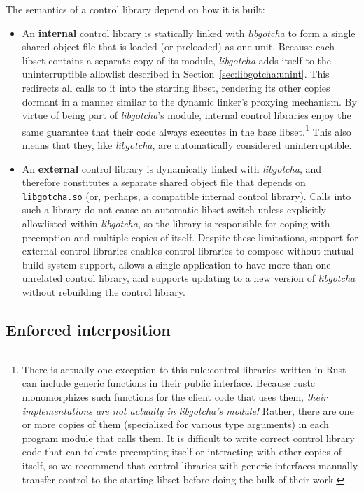 The semantics of a control library depend on how it is built:
\begin{itemize}
\item An \textbf{internal} control library is statically linked with
	\textit{libgotcha} to form a single shared object file that is loaded (or
	preloaded) as one unit.  Because each libset contains a separate copy of
	its module, \textit{libgotcha} adds itself to the uninterruptible allowlist
	described in Section~\ref{sec:libgotcha:unint}.  This redirects all calls to
	it into the starting libset, rendering its other copies dormant in a manner
	similar to the dynamic linker's proxying mechanism.  By virtue of being part
	of \textit{libgotcha}'s module, internal control libraries enjoy the same
	guarantee that their code always executes in the base libset.\footnote{There
	is actually one exception to this rule:\@ control libraries written in Rust
	can include generic functions in their public interface.  Because rustc
	monomorphizes such functions for the client code that uses them,
	\textit{their implementations are not actually in \textrm{libgotcha}'s
	module!}  Rather, there are one or more copies of them (specialized for
	various type arguments) in each program module that calls them.  It is
	difficult to write correct control library code that can tolerate preempting
	itself or interacting with other copies of itself, so we recommend that
	control libraries with generic interfaces manually transfer control to the
	starting libset before doing the bulk of their work.}  This also means that
	they, like \textit{libgotcha}, are automatically considered uninterruptible.
\item An \textbf{external} control library is dynamically linked with
	\textit{libgotcha}, and therefore constitutes a separate shared object file
	that depends on \texttt{libgotcha.so} (or, perhaps, a compatible internal
	control library).  Calls into such a library do not cause an automatic libset
	switch unless explicitly allowlisted within \textit{libgotcha}, so the
	library is responsible for coping with preemption and multiple copies of
	itself.  Despite these limitations, support for external control libraries
	enables control libraries to compose without mutual build system support,
	allows a single application to have more than one unrelated control library,
	and supports updating to a new version of \textit{libgotcha} without
	rebuilding the control library.
\end{itemize}


\subsection{Enforced interposition}
\label{sec:libgotcha:interpose}

